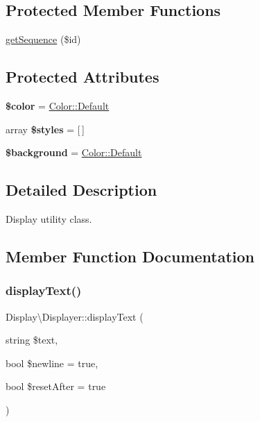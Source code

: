 \subsection*{Protected Member Functions}
\begin{DoxyCompactItemize}
\item 
\hyperlink{classDisplay_1_1Displayer_a51f8584319905e94fd622a91a79072f8}{get\+Sequence} (\$id)
\end{DoxyCompactItemize}
\subsection*{Protected Attributes}
\begin{DoxyCompactItemize}
\item 
\mbox{\label{classDisplay_1_1Displayer_a54d4898c73256f0c3b02616cf1bab7fd}} 
{\bfseries \$color} = \hyperlink{classDisplay_1_1Color_a667403f6acc19e11a5edeae75ca44c6d}{Color\+::\+Default}
\item 
\mbox{\label{classDisplay_1_1Displayer_aa3aa38460d82a6f85298eb84dd369513}} 
array {\bfseries \$styles} = \mbox{[}$\,$\mbox{]}
\item 
\mbox{\label{classDisplay_1_1Displayer_a254583ce5b771169dff389a30b82a54d}} 
{\bfseries \$background} = \hyperlink{classDisplay_1_1Color_a667403f6acc19e11a5edeae75ca44c6d}{Color\+::\+Default}
\end{DoxyCompactItemize}


\subsection{Detailed Description}
Display utility class. 

\subsection{Member Function Documentation}
\mbox{\label{classDisplay_1_1Displayer_a2e7ce80672e8e2433dce68eb7850090d}} 
\subsubsection{\texorpdfstring{display\+Text()}{displayText()}}
{\footnotesize\ttfamily Display\textbackslash{}\+Displayer\+::display\+Text (\begin{DoxyParamCaption}\item[{string}]{\$text,  }\item[{bool}]{\$newline = {\ttfamily true},  }\item[{bool}]{\$reset\+After = {\ttfamily true} }\end{DoxyParamCaption})}


